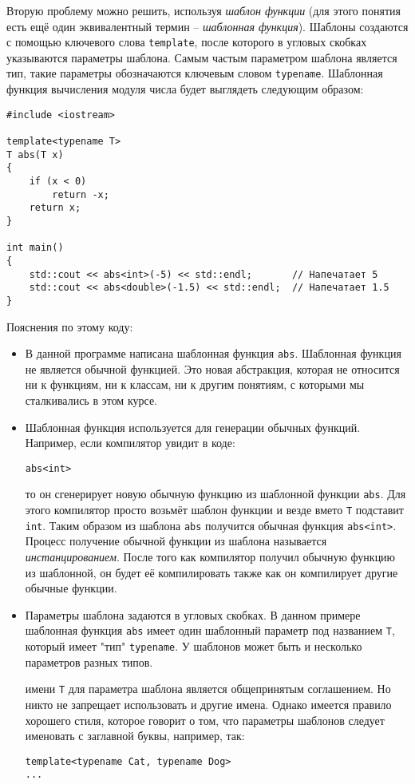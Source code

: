 \documentclass{article}
\begin{document}
\newpage
\noindent Вторую проблему можно решить, используя \textit{шаблон функции} (для этого понятия есть ещё один эквивалентный термин -- \textit{шаблонная функция}). Шаблоны создаются с помощью ключевого слова \texttt{template}, после которого в угловых скобках указываются параметры шаблона. Самым частым параметром шаблона является тип, такие параметры обозначаются ключевым словом \texttt{typename}. Шаблонная функция вычисления модуля числа будет выглядеть следующим образом:
\begin{lstlisting}
#include <iostream>

template<typename T>
T abs(T x)
{
	if (x < 0)
		return -x;
	return x;
}

int main()
{
	std::cout << abs<int>(-5) << std::endl;       // Напечатает 5
	std::cout << abs<double>(-1.5) << std::endl;  // Напечатает 1.5
}
\end{lstlisting}
Пояснения по этому коду:
\begin{itemize}
\item В данной программе написана шаблонная функция \texttt{abs}. Шаблонная функция не является обычной функцией. Это новая абстракция, которая не относится ни к функциям, ни к классам, ни к другим понятиям, с которыми мы сталкивались в этом курсе.

\item Шаблонная функция используется для генерации обычных функций. Например, если компилятор увидит в коде:
\begin{lstlisting}
abs<int>
\end{lstlisting}
то он сгенерирует новую обычную функцию из шаблонной функции \texttt{abs}. Для этого компилятор просто возьмёт шаблон функции и везде вмето \texttt{T} подставит \texttt{int}. Таким образом из шаблона \texttt{abs} получится обычная функция \texttt{abs<int>}. Процесс получение обычной функции из шаблона называется \textit{инстанцированием}. После того как компилятор получил обычную функцию из шаблонной, он будет её компилировать также как он компилирует другие обычные функции.

\item Параметры шаблона задаются в угловых скобках. В данном примере шаблонная функция \texttt{abs} имеет один шаблонный параметр под названием \texttt{T}, который имеет "тип"{} \texttt{typename}. У шаблонов может быть и несколько параметров разных типов.

 имени \texttt{T} для параметра шаблона является общепринятым соглашением. Но никто не запрещает использовать и другие имена. Однако имеется правило хорошего стиля, которое говорит о том, что параметры шаблонов следует именовать с заглавной буквы, например, так:
\begin{lstlisting}
template<typename Cat, typename Dog>
...
\end{lstlisting}
\end{itemize}
\end{document}
